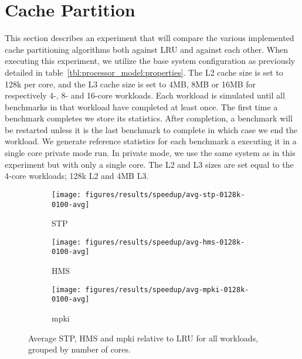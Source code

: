 
\section{Cache Partition}
\label{sec:results:cache_partition}

This section describes an experiment that will compare the various implemented cache partitioning algorithms both against LRU and against each other.
When executing this experiment, we utilize the base system configuration as previously detailed in table~\ref{tbl:processor_model:properties}.
The L2 cache size is set to 128k per core, and the L3 cache size is set to 4MB, 8MB or 16MB for respectively 4-, 8- and 16-core workloads.
Each workload is simulated until all benchmarks in that workload have completed at least once. 
The first time a benchmark completes we store its statistics.
After completion, a benchmark will be restarted unless it is the last benchmark to complete in which case we end the workload.
We generate reference statistics for each benchmark a executing it in a single core private mode run.
In private mode, we use the same system as in this experiment but with only a single core.
The L2 and L3 sizes are set equal to the 4-core workloads; 128k L2 and 4MB L3.

\begin{figure}[!htb]
    \centering
    \begin{subfigure}[b]{0.5\textwidth}
        \texttt{[image: figures/results/speedup/avg-stp-0128k-0100-avg]}
        \caption{STP}
        \label{fig:results:base:avg:stp}
    \end{subfigure}%
    \begin{subfigure}[b]{0.5\textwidth}
        \texttt{[image: figures/results/speedup/avg-hms-0128k-0100-avg]}
        \caption{HMS}
        \label{fig:results:base:avg:hms}
    \end{subfigure}
    \begin{subfigure}[b]{0.5\textwidth}
        \texttt{[image: figures/results/speedup/avg-mpki-0128k-0100-avg]}
        \caption{mpki}
        \label{fig:results:base:avg:mpki}
    \end{subfigure}
    \caption{Average STP, HMS and mpki relative to LRU for all workloads, grouped by number of cores.}
    \label{fig:results:base:avg}
\end{figure}

